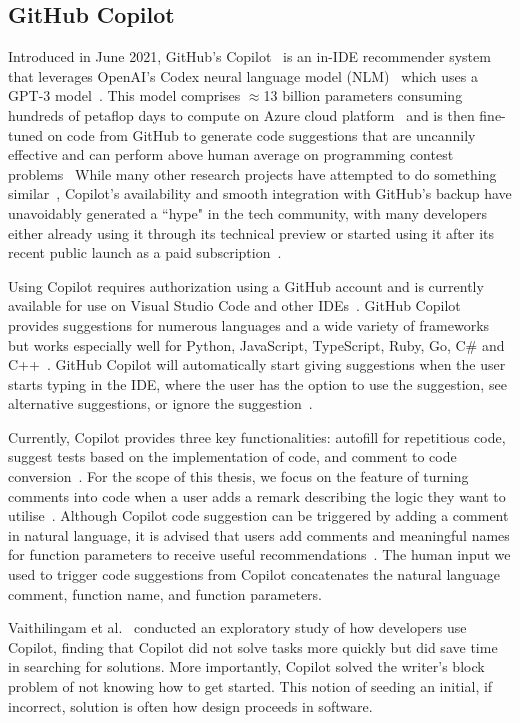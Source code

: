 \subsection{GitHub Copilot}
Introduced in June 2021, GitHub's Copilot~\cite{Copilot-web} is an in-IDE recommender system that leverages OpenAI's Codex neural language model (NLM)~\cite{copilot} which uses a GPT-3 model~\cite{Gpt3}. This model comprises $\approx$13 billion parameters consuming hundreds of petaflop days to compute on Azure cloud platform~\cite{copilot} and is then fine-tuned on code from GitHub to generate code suggestions that are uncannily effective and can perform above human average on programming contest problems~\cite{empirical_eval}
While many other research projects have attempted to do something similar~\cite{codesearch, natural, coacor}, Copilot's availability and smooth integration with GitHub's backup have unavoidably generated a ``hype" in the tech community, with many developers either already using it through its technical preview or started using it after its recent public launch as a paid subscription~\cite{Copilot-web}. 

Using Copilot requires authorization using a GitHub account and is currently available for use on Visual Studio Code and other IDEs~\cite{Copilot-web}. GitHub Copilot provides suggestions for numerous languages and a wide variety of frameworks but works especially well for Python, JavaScript, TypeScript, Ruby, Go, C\# and C++~\cite{Copilot-web}. GitHub Copilot will automatically start giving suggestions when the user starts typing in the IDE, where the user has the option to use the suggestion, see alternative suggestions, or ignore the suggestion~\cite{Copilot-web}.

Currently, Copilot provides three key functionalities: autofill for repetitious code, suggest tests based on the implementation of code, and comment to code conversion~\cite{Copilot-web}. For the scope of this thesis, we focus on the feature of turning comments into code when a user adds a remark describing the logic they want to utilise~\cite{Copilot-web}. 
Although Copilot code suggestion can be triggered by adding a comment in natural language, it is advised that users add comments and meaningful names for function parameters to receive useful recommendations~\cite{Copilot-web}. 
The human input we used to trigger code suggestions from Copilot concatenates the natural language comment, function name, and function parameters.

Vaithilingam et al.~\cite{Vaithilingam2022} conducted an exploratory study of how developers use Copilot, finding that Copilot did not solve tasks more quickly but did save time in searching for solutions. 
More importantly, Copilot solved the writer's block problem of not knowing how to get started. This notion of seeding an initial, if incorrect, solution is often how design proceeds in software. 


